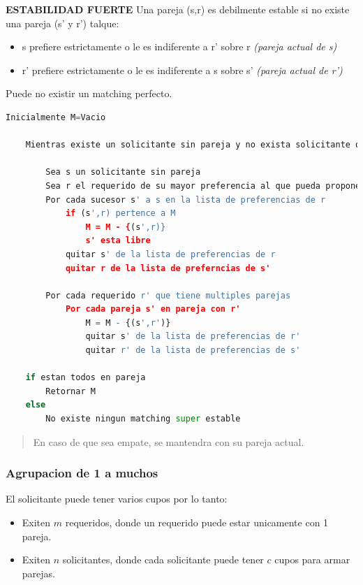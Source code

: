 \documentclass{article}
\begin{document}
\noindent
\textbf{ESTABILIDAD FUERTE}
\newline Una pareja (s,r) es debilmente estable si no existe una pareja (s' y r') talque:
\begin{itemize}
    \item s prefiere estrictamente o le es indiferente a r' sobre r \textit{(pareja actual de s)}
    \item r' prefiere estrictamente o le es indiferente a s sobre s' \textit{(pareja actual de r')}
\end{itemize}
Puede no existir un matching perfecto.

\begin{lstlisting}[language=Python, caption=Algoritmo para parejas super estables]
    Inicialmente M=Vacio
    
    Mientras existe un solicitante sin pareja y no exista solicitante que agoto sus parejas
    
        Sea s un solicitante sin pareja
        Sea r el requerido de su mayor preferencia al que pueda proponer
        Por cada sucesor s' a s en la lista de preferencias de r
            if (s',r) pertence a M
                M = M - {(s',r)}
                s' esta libre
            quitar s' de la lista de preferencias de r
            quitar r de la lista de preferncias de s'

        Por cada requerido r' que tiene multiples parejas
            Por cada pareja s' en pareja con r' 
                M = M - {(s',r')}
                quitar s' de la lista de preferencias de r'
                quitar r' de la lista de preferencias de s'

    if estan todos en pareja
        Retornar M
    else
        No existe ningun matching super estable
\end{lstlisting}    
\begin{quote}
    En caso de que sea empate, se mantendra con su pareja actual.
\end{quote}

\newpage
\subsubsection{Agrupacion de 1 a muchos}
El solicitante puede tener varios cupos por lo tanto:
\begin{itemize}
    \item Exiten \(m\) requeridos, donde un requerido puede estar unicamente con 1 pareja.
    \item Exiten \(n\) solicitantes, donde cada solicitante puede tener \(c\) cupos para armar parejas.
\end{itemize}
\end{document}
